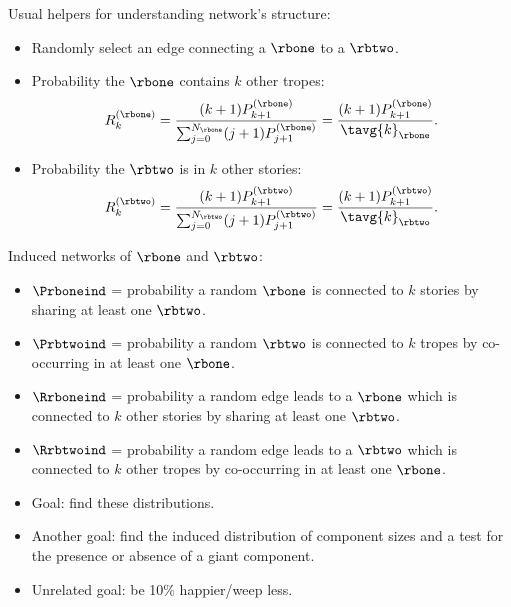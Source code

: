 \begin{frame}

  \begin{block}{Usual helpers for understanding network's structure:}
    \begin{itemize}
    \item 
      Randomly select an edge connecting 
      a $\rbone$ to a $\rbtwo$.
    \item<+->
      Probability the $\rbone$ contains $k$ other tropes:
      $$
      R^{(\rbone)}_{k}
      =
      \frac{
        (k+1)P^{(\rbone)}_{k+1}
      }
      {
        \sum_{j=0}^{N_\rbone}(j+1)P^{(\rbone)}_{j+1}
      }
      =
      \frac{
        (k+1)P^{(\rbone)}_{k+1}
      }
      {
        \tavg{k}_\rbone
      }.
      $$
    \item<+->
      Probability the $\rbtwo$ is in $k$ other stories:
      $$
      R^{(\rbtwo)}_{k}
      =
      \frac{
        (k+1)P^{(\rbtwo)}_{k+1}
      }
      {
        \sum_{j=0}^{N_\rbtwo}(j+1)P^{(\rbtwo)}_{j+1}
      }
      =
      \frac{
        (k+1)P^{(\rbtwo)}_{k+1}
      }
      {
        \tavg{k}_\rbtwo
      }.
      $$
    \end{itemize}
  \end{block}

\end{frame}

\begin{frame}

  \begin{block}{Induced networks of $\rbone$ and $\rbtwo$:}
    \begin{itemize}
    \item<+-> 
      $\Prboneind$ = probability a random $\rbone$ is connected
      to $k$ stories by sharing at least one $\rbtwo$.
    \item<+-> 
      $\Prbtwoind$ = probability a random $\rbtwo$ is connected
      to $k$ tropes by co-occurring in at least one $\rbone$.
    \item<+-> 
      $\Rrboneind$ = probability a random edge leads to a $\rbone$
      which is connected
      to $k$ other stories by sharing at least one $\rbtwo$.
    \item<+-> 
      $\Rrbtwoind$ = probability a random edge leads to a $\rbtwo$ 
      which is connected
      to $k$ other tropes by co-occurring in at least one $\rbone$.
    \item<+-> 
      Goal: find these distributions.
    \item<+-> 
      Another goal: find the induced distribution of component sizes
      and a test for the presence or absence of a giant component.
    \item<+-> 
      Unrelated goal: be 10\% happier/weep less.
    \end{itemize}
  \end{block}

\end{frame}



